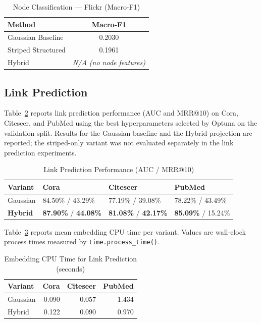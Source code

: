 \documentclass[conference]{IEEEtran}
\begin{document}
\begin{table}[ht]
\centering
\caption{Node Classification --- Flickr (Macro-F1)}
\label{tab:nc_flickr}
\begin{tabular}{lc}
\toprule
\textbf{Method} & \textbf{Macro-F1} \\
\midrule
Gaussian Baseline   & 0.2030 \\
Striped Structured  & 0.1961 \\
Hybrid              & \textit{N/A (no node features)} \\
\bottomrule
\end{tabular}
\end{table}

\subsection{Link Prediction}

Table~\ref{tab:lp_results} reports link prediction performance (AUC and
MRR@10) on Cora, Citeseer, and PubMed using the best hyperparameters
selected by Optuna on the validation split. Results for the Gaussian baseline
and the Hybrid projection are reported; the striped-only variant was not
evaluated separately in the link prediction experiments.

\begin{table}[ht]
\centering
\caption{Link Prediction Performance (AUC / MRR@10)}
\label{tab:lp_results}
\begin{tabular}{llll}
\toprule
\textbf{Variant} & \textbf{Cora} & \textbf{Citeseer} & \textbf{PubMed} \\
\midrule
Gaussian  & 84.50\% / 43.29\% & 77.19\% / 39.08\% & 78.22\% / 43.49\% \\
\textbf{Hybrid}    & \textbf{87.90\%} / \textbf{44.08\%} & \textbf{81.08\%} / \textbf{42.17\%} & \textbf{85.09\%} / 15.24\% \\
\bottomrule
\end{tabular}
\end{table}

Table~\ref{tab:lp_time} reports mean embedding CPU time per variant. Values
are wall-clock process times measured by \texttt{time.process\_time()}.

\begin{table}[ht]
\centering
\caption{Embedding CPU Time for Link Prediction (seconds)}
\label{tab:lp_time}
\begin{tabular}{lrrr}
\toprule
\textbf{Variant} & \textbf{Cora} & \textbf{Citeseer} & \textbf{PubMed} \\
\midrule
Gaussian & 0.090 & 0.057 & 1.434 \\
Hybrid   & 0.122 & 0.090 & 0.970 \\
\bottomrule
\end{tabular}
\end{table}
\end{document}
